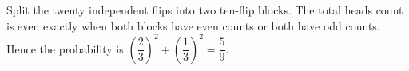 Split the twenty independent flips into two ten-flip blocks. The total heads count is even exactly when both blocks have even counts or both have odd counts. Hence the probability is $\left(\dfrac{2}{3}\right)^2+\left(\dfrac{1}{3}\right)^2=\boxed{\dfrac{5}{9}}$.
